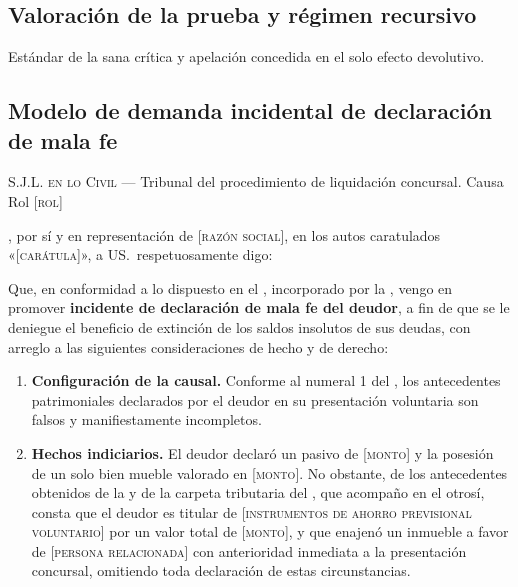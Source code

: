 \subsection{Valoración de la prueba y régimen recursivo}

Estándar de la sana crítica y apelación concedida en el solo efecto devolutivo.

\bloquePractico

\subsection{Modelo de demanda incidental de declaración de mala fe}

\begin{escrito}
\small
\noindent\textsc{S.J.L. en lo Civil} --- Tribunal del procedimiento de liquidación
concursal. Causa Rol [\textsc{rol}]

\medskip
{}, por sí y en representación de
[\textsc{razón social}], en los autos caratulados «[\textsc{carátula}]», a US.\
respetuosamente digo:

\medskip
Que, en conformidad a lo dispuesto en el , incorporado por la \Lreforma{},
vengo en promover \textbf{incidente de declaración de mala fe del deudor}, a fin de que
se le deniegue el beneficio de extinción de los saldos insolutos de sus deudas, con
arreglo a las siguientes consideraciones de hecho y de derecho:

\begin{enumerate}[leftmargin=1.6em]
  \item \textbf{Configuración de la causal.} Conforme al numeral 1 del , los
  antecedentes patrimoniales declarados por el deudor en su presentación voluntaria son
  falsos y manifiestamente incompletos.

  \item \textbf{Hechos indiciarios.} El deudor declaró un pasivo de [\textsc{monto}] y la
  posesión de un solo bien mueble valorado en [\textsc{monto}]. No obstante, de los
  antecedentes obtenidos de la \cmf{} y de la carpeta tributaria del \sii{}, que
  acompaño en el otrosí, consta que el deudor es titular de [\textsc{instrumentos de
  ahorro previsional voluntario}] por un valor total de [\textsc{monto}], y que enajenó
  un inmueble a favor de [\textsc{persona relacionada}] con anterioridad inmediata a la
  presentación concursal, omitiendo toda declaración de estas circunstancias.


\end{enumerate}
\end{escrito}
